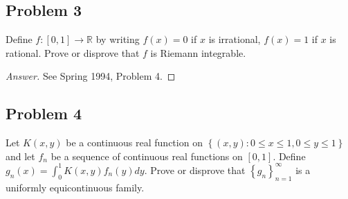 \documentclass[12pt]{article}
\newcommand{\real}{\mathbb{R}}
\newcommand\setb[1]{\left \{ #1 \right \}}
\theoremstyle{definition}
\begin{document}
\subsection{Problem 3}
Define $f : [0,1] \to \real$ by writing $f(x) = 0$ if $x$ is irrational, $f(x) = 1$ if $x$ is rational. Prove or disprove that $f$ is Riemann integrable. 
\begin{proof}[Answer]
    See Spring 1994, Problem 4. 
\end{proof}

\subsection{Problem 4}
Let $K(x,y)$ be a continuous real function on $\setb{ (x,y) : 0 \leq x \leq 1 , 0 \leq y \leq 1 }$ and let $f_n$ be a sequence of continuous real functions on $[0,1]$. Define $g_n(x) = \int_0^1 K(x,y) f_n(y) dy$. Prove or disprove that $\setb{ g_n }_{n = 1}^{\infty}$ is a uniformly equicontinuous family. 
\end{document}
